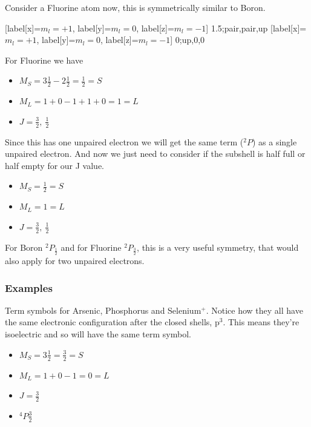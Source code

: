 \documentclass{article}
\begin{document}
    Consider a Fluorine atom now, this is symmetrically similar to Boron.
    \begin{center}
        \begin{modiagram}[style=square, AO-width=20pt]
             [label[x]={$m_l=+1$}, label[y]={$m_l=0$}, label[z]={$m_l=-1$}] {1.5;pair,pair,up}
             [label[x]={$m_l=+1$}, label[y]={$m_l=0$}, label[z]={$m_l=-1$}] {0;up,0,0}
        \end{modiagram}
    \end{center}
    For Fluorine we have 
    \begin{itemize}
        \item $M_S = 3\frac{1}{2} - 2\frac{1}{2} = \frac{1}{2} = S$
        \item $M_L = 1 + 0 - 1 + 1 + 0 = 1 = L$
        \item $J = \frac{3}{2},\ \frac{1}{2}$
    \end{itemize}
    Since this has one unpaired electron we will get the same term ($^2P$) as a single unpaired electron.
    And now we just need to consider if the subshell is half full or half empty for our J value.
    \begin{itemize}
        \item $M_S = \frac{1}{2} = S$
        \item $M_L = 1 = L$
        \item $J = \frac{3}{2},\ \frac{1}{2}$
    \end{itemize} 
    For Boron $^2P_\frac{1}{2}$ and for Fluorine $^2P_\frac{3}{2}$, this is a very useful symmetry, that would
    also apply for two unpaired electrons.

    \subsubsection{Examples}
    Term symbols for Arsenic, Phosphorus and Selenium$^+$. Notice how they all have the same electronic configuration
    after the closed shells, p$^3$. This means they're isoelectric and so will have the same term symbol.
    \begin{itemize}
        \item $M_S = 3\frac{1}{2} = \frac{3}{2} = S$
        \item $M_L = 1 + 0 - 1 = 0 = L$
        \item $J = \frac{3}{2}$
        \item $^4P\frac{3}{2}$
    \end{itemize}
\end{document}
